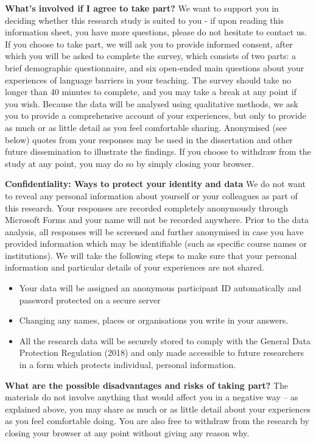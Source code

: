 \documentclass[
  english,
  letterpaper,
  DIV=11,
  numbers=noendperiod]{scrreprt}
\providecommand{\tightlist}{%
  \setlength{\itemsep}{0pt}\setlength{\parskip}{0pt}}
\begin{document}
\textbf{What's involved if I agree to take part?} We want to support you
in deciding whether this research study is suited to you - if upon
reading this information sheet, you have more questions, please do not
hesitate to contact us. If you choose to take part, we will ask you to
provide informed consent, after which you will be asked to complete the
survey, which consists of two parts: a brief demographic questionnaire,
and six open-ended main questions about your experiences of language
barriers in your teaching. The survey should take no longer than 40
minutes to complete, and you may take a break at any point if you wish.
Because the data will be analysed using qualitative methods, we ask you
to provide a comprehensive account of your experiences, but only to
provide as much or as little detail as you feel comfortable sharing.
Anonymised (see below) quotes from your responses may be used in the
dissertation and other future dissemination to illustrate the findings.
If you choose to withdraw from the study at any point, you may do so by
simply closing your browser.

\textbf{Confidentiality: Ways to protect your identity and data} We do
not want to reveal any personal information about yourself or your
colleagues as part of this research. Your responses are recorded
completely anonymously through Microsoft Forms and your name will not be
recorded anywhere. Prior to the data analysis, all responses will be
screened and further anonymised in case you have provided information
which may be identifiable (such as specific course names or
institutions). We will take the following steps to make sure that your
personal information and particular details of your experiences are not
shared.

\begin{itemize}
\tightlist
\item
  Your data will be assigned an anonymous participant ID automatically
  and password protected on a secure server
\item
  Changing any names, places or organisations you write in your answers.
\item
  All the research data will be securely stored to comply with the
  General Data Protection Regulation (2018) and only made accessible to
  future researchers in a form which protects individual, personal
  information.
\end{itemize}

\textbf{What are the possible disadvantages and risks of taking part? }
The materials do not involve anything that would affect you in a
negative way -- as explained above, you may share as much or as little
detail about your experiences as you feel comfortable doing. You are
also free to withdraw from the research by closing your browser at any
point without giving any reason why.
\end{document}
